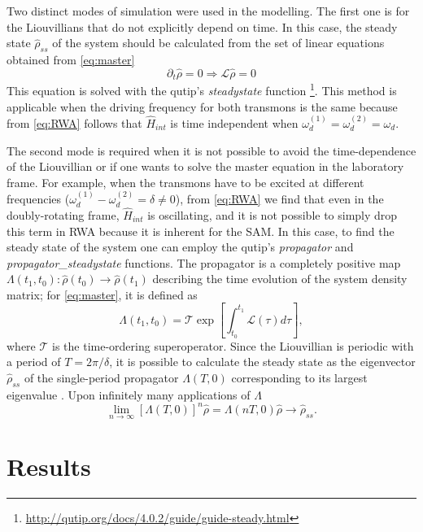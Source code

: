 \documentclass[%
 aps, prx,
 amsmath,amssymb,
 reprint,%
superscriptaddress
]{revtex4-2}
\begin{document}
Two distinct modes of simulation were used in the 
modelling. The first one is for the Liouvillians 
that do not explicitly depend on time. In this 
case, the steady state $\hat \rho_{ss}$ of the 
system should be calculated from the set of 
linear equations obtained from \autoref{eq:master}
\begin{equation}
\partial_t \hat \rho = 0  \Rightarrow \mathcal{L} 
\hat \rho = 0
\label{eq:steady}
\end{equation}
This equation is solved with the qutip's 
\textit{steadystate} 
function \footnote{\url{http://qutip.org/docs/4.0.2/guide/guide-steady.html}}.
 This method is applicable when the driving 
frequency for both transmons is the same because 
from \autoref{eq:RWA} follows that $\hat H_{int}$ 
is time independent when $\omega_d^{(1)} = 
\omega_d^{(2)} = 
\omega_d$.

The second mode is required when it is not 
possible to avoid the time-dependence of the 
Liouvillian or if one wants to solve the master 
equation in the laboratory frame. For example, 
when the transmons have to be excited at 
different frequencies ($\omega_d^{(1)} - \omega_d^{(2)} = 
\delta \neq 0$), from \autoref{eq:RWA} we find 
that even in the doubly-rotating frame, $\hat 
H_{int}$ is oscillating, and it is not possible 
to simply drop this term in RWA because it is 
inherent for the SAM. In this case, to find the 
steady state of the system one can employ the 
qutip's \textit{propagator} and 
\textit{propagator\_steadystate} functions. The 
propagator is a completely positive map 
$\Lambda(t_1, t_0): \hat \rho(t_0) \rightarrow 
\hat \rho(t_1)$ describing the time evolution of 
the system density matrix; for 
\autoref{eq:master}, it is defined as
\begin{equation}
\Lambda(t_1, t_0) = \mathcal{T} \exp [\int_{t_0}^{t_1} \mathcal L(\tau) d\tau],
\label{eq:propagator}
\end{equation}
where $\mathcal T$ is the time-ordering 
superoperator. Since the Liouvillian is periodic 
with a period of $T = 2\pi/\delta$, it is 
possible to calculate the steady state as the 
eigenvector $\hat \rho_{ss}$ of the single-period 
propagator $\Lambda(T, 0)$ corresponding to its 
largest eigenvalue  \cite{dittrich1998quantum, 
rivas2012open}. Upon infinitely many applications 
of $\Lambda$
\[
\lim_{n\to \infty} \left[\Lambda(T, 0)\right]^n \hat \rho = \Lambda(nT, 0) \hat \rho \to \hat \rho_{ss}.
\]


\section{Results}
\end{document}
